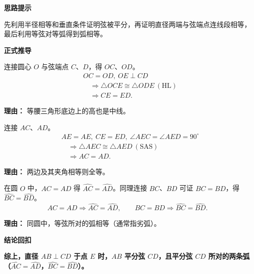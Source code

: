 \begin{proofbox}
	\textbf{\textcolor{CProof}{思路提示}}

	先利用半径相等和垂直条件证明弦被平分，再证明直径两端与弦端点连线段相等，最后利用等弦对等弧得到弧相等。

	\medskip
	\textbf{\textcolor{CProof}{正式推导}}
	\begin{description}[style=nextline, leftmargin=2.8em, labelsep=0.5em, itemsep=0.55em]
		\item[\textbf{步骤一（半径证平分）：}] 连接圆心 $O$ 与弦端点 $C$、$D$，得 $OC$、$OD$。
			\[
				\begin{aligned}
					& OC=OD,\ OE\perp CD \\
					&\quad \Longrightarrow \triangle OCE\cong\triangle ODE\ (\text{HL}) \\
					&\quad \Longrightarrow CE=ED.
			\end{aligned}
			\]
			\par\textbf{理由：} 等腰三角形底边上的高也是中线。

		\item[\textbf{步骤二（端点证等弦）：}] 连接 $AC$、$AD$。
			\[
				\begin{aligned}
					& AE=AE,\ CE=ED,\ \angle AEC=\angle AED=90^\circ \\
					&\quad \Longrightarrow \triangle AEC\cong\triangle AED\ (\text{SAS}) \\
					&\quad \Longrightarrow AC=AD.
			\end{aligned}
			\]
			\par\textbf{理由：} 两边及其夹角相等则全等。

		\item[\textbf{步骤三（等弦推等弧）：}] 在圆 $O$ 中，$AC=AD$ 得 $\widehat{AC}=\widehat{AD}$。同理连接 $BC$、$BD$ 可证 $BC=BD$，得 $\widehat{BC}=\widehat{BD}$。
			\[
				AC=AD \Longrightarrow \widehat{AC}=\widehat{AD},
				\qquad
				BC=BD \Longrightarrow \widehat{BC}=\widehat{BD}.
			\]
			\par\textbf{理由：} 同圆中，等弦所对的弧相等（通常指劣弧）。
	\end{description}

	\medskip
	\textbf{\textcolor{CProof}{结论回扣}}

	\textbf{综上，直径 $AB\perp CD$ 于点 $E$ 时，$AB$ 平分弦 $CD$，且平分弦 $CD$ 所对的两条弧（$\widehat{AC}=\widehat{AD}$，$\widehat{BC}=\widehat{BD}$）。}
\end{proofbox}

